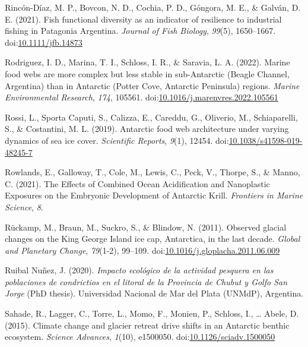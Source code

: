 \documentclass[
]{article}
\newlength{\cslhangindent}
\newlength{\cslentryspacingunit} %
\newenvironment{CSLReferences}[2] %
 {%
  \setlength{\parindent}{0pt}
  \ifodd #1
  \let\oldpar\par
  \def\par{\hangindent=\cslhangindent\oldpar}
  \fi
  \setlength{\parskip}{#2\cslentryspacingunit}
 }%
 {}
\begin{document}
\begin{CSLReferences}{1}{0}
\leavevmode{}%
Rincón-Díaz, M. P., Bovcon, N. D., Cochia, P. D., Góngora, M. E., \&
Galván, D. E. (2021). Fish functional diversity as an indicator of
resilience to industrial fishing in {Patagonia Argentina}. \emph{Journal
of Fish Biology}, \emph{99}(5), 1650--1667.
doi:\href{https://doi.org/10.1111/jfb.14873}{10.1111/jfb.14873}

\leavevmode{}%
Rodriguez, I. D., Marina, T. I., Schloss, I. R., \& Saravia, L. A.
(2022). Marine food webs are more complex but less stable in
sub-{Antarctic} ({Beagle Channel}, {Argentina}) than in {Antarctic}
({Potter Cove}, {Antarctic Peninsula}) regions. \emph{Marine
Environmental Research}, \emph{174}, 105561.
doi:\href{https://doi.org/10.1016/j.marenvres.2022.105561}{10.1016/j.marenvres.2022.105561}

\leavevmode{}%
Rossi, L., Sporta Caputi, S., Calizza, E., Careddu, G., Oliverio, M.,
Schiaparelli, S., \& Costantini, M. L. (2019). Antarctic food web
architecture under varying dynamics of sea ice cover. \emph{Scientific
Reports}, \emph{9}(1), 12454.
doi:\href{https://doi.org/10.1038/s41598-019-48245-7}{10.1038/s41598-019-48245-7}

\leavevmode{}%
Rowlands, E., Galloway, T., Cole, M., Lewis, C., Peck, V., Thorpe, S.,
\& Manno, C. (2021). The {Effects} of {Combined Ocean Acidification} and
{Nanoplastic Exposures} on the {Embryonic Development} of {Antarctic
Krill}. \emph{Frontiers in Marine Science}, \emph{8}.

\leavevmode{}%
Rückamp, M., Braun, M., Suckro, S., \& Blindow, N. (2011). Observed
glacial changes on the {King George Island} ice cap, {Antarctica}, in
the last decade. \emph{Global and Planetary Change}, \emph{79}(1-2),
99--109.
doi:\href{https://doi.org/10.1016/j.gloplacha.2011.06.009}{10.1016/j.gloplacha.2011.06.009}

\leavevmode{}%
Ruibal Nuñez, J. (2020). \emph{{Impacto ecológico de la actividad
pesquera en las poblaciones de condrictios en el litoral de la Provincia
de Chubut y Golfo San Jorge}} (PhD thesis). Universidad Nacional de Mar
del Plata (UNMdP), {Argentina}.

\leavevmode{}%
Sahade, R., Lagger, C., Torre, L., Momo, F., Monien, P., Schloss, I.,
\ldots{} Abele, D. (2015). Climate change and glacier retreat drive
shifts in an {Antarctic} benthic ecosystem. \emph{Science Advances},
\emph{1}(10), e1500050.
doi:\href{https://doi.org/10.1126/sciadv.1500050}{10.1126/sciadv.1500050}


\end{CSLReferences}
\end{document}
